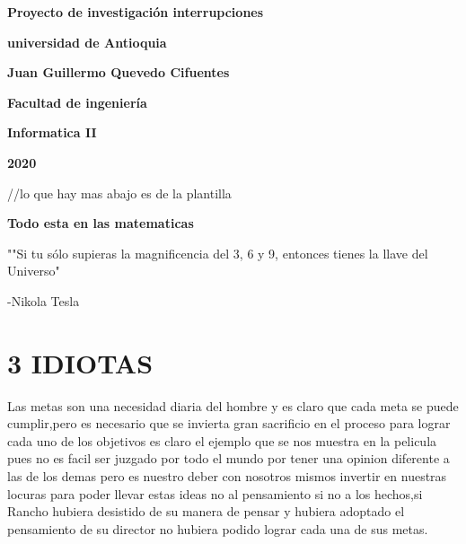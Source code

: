 \documentclass[12pt]{article}
\begin{document}
\begin{center}
\bf{\sc\Huge Proyecto de investigación interrupciones}\\
\end{center}
\vspace{60pt}
\begin{center}
\bf{\sc\Huge universidad de Antioquia}\\
\end{center}
\vspace{120pt}
\begin{center}
\bf{\sc\Huge Juan Guillermo Quevedo Cifuentes }\\
\end{center}
\vspace{120pt}
\begin{center}
\bf{\sc\Huge Facultad de ingeniería}
\end{center}
\vspace{5pt}
\begin{center}
\bf{\sc\Huge Informatica II}
\end{center}
\vspace{5pt}
\begin{center}
\bf{\sc\Huge 2020}\\
\end{center}
\newpage
//lo que hay mas abajo es de la plantilla

\begin{center}

\bf{\sc\Huge Todo esta en las matematicas }\\
\end{center}
\begin{flushleft}
\vspace{25PT}
\large
""Si tu sólo supieras la magnificencia del 3, 6 y 9, entonces tienes la llave del Universo" 


-Nikola Tesla
\end{flushleft}
\vspace{25PT}
\section{ 3 IDIOTAS}
\large
Las metas son una necesidad diaria del hombre y es claro que cada meta se puede cumplir,pero es necesario que se invierta gran sacrificio en el proceso para lograr cada uno de los objetivos es claro el ejemplo que se nos muestra en la pelicula pues no es facil ser juzgado por todo el mundo por tener una opinion diferente a las de los demas pero es nuestro deber con nosotros mismos invertir en nuestras locuras para poder llevar estas ideas no al pensamiento si no a los hechos,si Rancho hubiera desistido de su manera de pensar y hubiera adoptado el pensamiento de su director no hubiera podido lograr cada una de sus metas.
\end{document}
